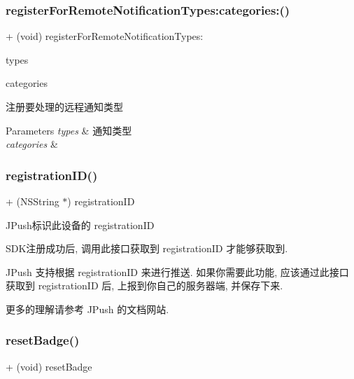\subsubsection{\texorpdfstring{register\+For\+Remote\+Notification\+Types\+:categories\+:()}{registerForRemoteNotificationTypes:categories:()}}
{\footnotesize\ttfamily + (void) register\+For\+Remote\+Notification\+Types\+: \begin{DoxyParamCaption}\item[{(N\+S\+U\+Integer)}]{types }\item[{categories:(N\+S\+Set $\ast$)}]{categories }\end{DoxyParamCaption}}

注册要处理的远程通知类型


\begin{DoxyParams}{Parameters}
{\em types} & 通知类型 \\
\hline
{\em categories} & \\
\hline
\end{DoxyParams}
\mbox{\label{interface_j_p_u_s_h_service_aaf7a20d918b1518f605c581d83e2c968}} 
\subsubsection{\texorpdfstring{registration\+I\+D()}{registrationID()}}
{\footnotesize\ttfamily + (N\+S\+String $\ast$) registration\+ID \begin{DoxyParamCaption}{ }\end{DoxyParamCaption}}

J\+Push标识此设备的 registration\+ID

S\+D\+K注册成功后, 调用此接口获取到 registration\+ID 才能够获取到.

J\+Push 支持根据 registration\+ID 来进行推送. 如果你需要此功能, 应该通过此接口获取到 registration\+ID 后, 上报到你自己的服务器端, 并保存下来.

更多的理解请参考 J\+Push 的文档网站. \mbox{\label{interface_j_p_u_s_h_service_acedc38cd5a3960208bf4338525c679c9}} 
\subsubsection{\texorpdfstring{reset\+Badge()}{resetBadge()}}
{\footnotesize\ttfamily + (void) reset\+Badge \begin{DoxyParamCaption}{ }\end{DoxyParamCaption}}

